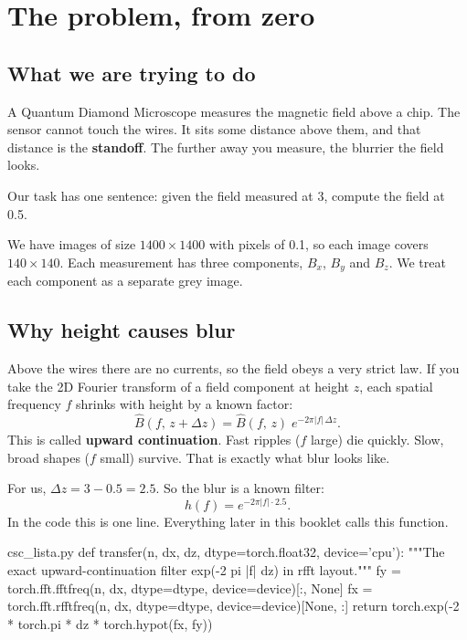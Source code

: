 \chapter{The problem, from zero}\label{ch:problem}

\section{What we are trying to do}

A Quantum Diamond Microscope measures the magnetic field above a chip. The sensor cannot touch
the wires. It sits some distance above them, and that distance is the \textbf{standoff}. The
further away you measure, the blurrier the field looks.

Our task has one sentence: given the field measured at 3\um, compute the field at 0.5\um.

We have images of size $1400\times1400$ with pixels of 0.1\um, so each image covers
$140\times140$\um. Each measurement has three components, $B_x$, $B_y$ and $B_z$. We treat
each component as a separate grey image.

\section{Why height causes blur}

Above the wires there are no currents, so the field obeys a very strict law. If you take the
2D Fourier transform of a field component at height $z$, each spatial frequency $f$ shrinks
with height by a known factor:
\begin{equation}
\widehat{B}(f,\,z+\Delta z) = \widehat{B}(f,\,z)\; e^{-2\pi |f|\,\Delta z}.
\end{equation}
This is called \textbf{upward continuation}. Fast ripples ($f$ large) die quickly. Slow, broad
shapes ($f$ small) survive. That is exactly what blur looks like.

For us, $\Delta z = 3 - 0.5 = 2.5$\um. So the blur is a known filter:
\begin{equation}
h(f) = e^{-2\pi |f| \cdot 2.5}.
\end{equation}
In the code this is one line. Everything later in this booklet calls this function.

\begin{code*}{csc_lista.py}
def transfer(n, dx, dz, dtype=torch.float32, device='cpu'):
    """The exact upward-continuation filter exp(-2 pi |f| dz) in rfft layout."""
    fy = torch.fft.fftfreq(n, dx, dtype=dtype, device=device)[:, None]
    fx = torch.fft.rfftfreq(n, dx, dtype=dtype, device=device)[None, :]
    return torch.exp(-2 * torch.pi * dz * torch.hypot(fx, fy))
\end{code*}

